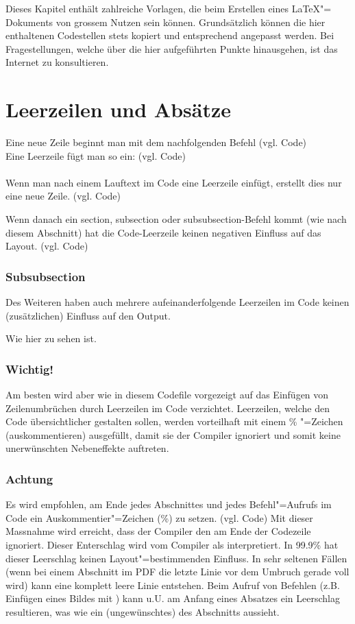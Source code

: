 %
Dieses Kapitel enthält zahlreiche Vorlagen, die beim Erstellen eines \LaTeX "= Dokuments von grossem Nutzen sein können. Grundsätzlich können die hier enthaltenen Codestellen stets kopiert und entsprechend angepasst werden. Bei Fragestellungen, welche über die hier aufgeführten Punkte hinausgehen, ist das Internet zu konsultieren.%
%
\section{Leerzeilen und Absätze}%
%
Eine neue Zeile beginnt man mit dem nachfolgenden Befehl (vgl. Code) \\
Eine Leerzeile fügt man so ein: (vgl. Code) \\ \\
Wenn man nach einem Lauftext im Code eine Leerzeile einfügt, erstellt dies nur eine neue Zeile. (vgl. Code)

Wenn danach ein section, subsection oder subsubsection-Befehl kommt (wie nach diesem Abschnitt) hat die Code-Leerzeile keinen negativen Einfluss auf das Layout. (vgl. Code) 

\subsubsection{Subsubsection}

Des Weiteren haben auch mehrere aufeinanderfolgende Leerzeilen im Code keinen (zusätzlichen) Einfluss auf den Output.






Wie hier zu sehen ist.
%
\subsubsection{Wichtig!}
%
Am besten wird aber wie in diesem Codefile vorgezeigt auf das Einfügen von Zeilenumbrüchen durch Leerzeilen im Code verzichtet. Leerzeilen, welche den Code übersichtlicher gestalten sollen, werden vorteilhaft mit einem \% "=Zeichen (auskommentieren) ausgefüllt, damit sie der Compiler ignoriert und somit keine unerwünschten Nebeneffekte auftreten.
%
\subsubsection{Achtung}%
%
Es wird empfohlen, am Ende jedes Abschnittes und jedes Befehl"=Aufrufs im Code ein Auskommentier"=Zeichen (\%) zu setzen. (vgl. Code)%
%
Mit dieser Massnahme wird erreicht, dass der Compiler den  am Ende der Codezeile ignoriert. Dieser Enterschlag wird vom Compiler als  interpretiert. In 99.9\% hat dieser Leerschlag keinen Layout"=bestimmenden Einfluss. In sehr seltenen Fällen (wenn bei einem Abschnitt im PDF die letzte Linie vor dem Umbruch gerade voll wird) kann eine komplett leere Linie entstehen. Beim Aufruf von Befehlen (z.B. Einfügen eines Bildes mit ) kann u.U. am Anfang eines Absatzes ein Leerschlag resultieren, was wie ein (ungewünschtes)  des Abschnitts aussieht. 
%
%
%
%
%
